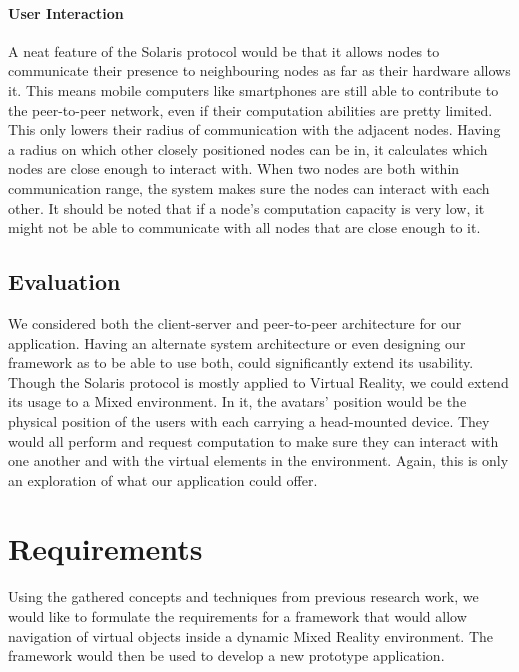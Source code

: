 \paragraph{User Interaction}
A neat feature of the Solaris protocol\cite{keller2002toward} would be that it allows nodes to communicate their presence to neighbouring nodes as far as their hardware allows it. This means mobile computers like smartphones are still able to contribute to the peer-to-peer network, even if their computation abilities are pretty limited. This only lowers their radius of communication with the adjacent nodes. 
\newline
Having a radius on which other closely positioned nodes can be in, it calculates which nodes are close enough to interact with. When two nodes are both within communication range, the system makes sure the nodes can interact with each other. It should be noted that if a node's computation capacity is very low, it might not be able to communicate with all nodes that are close enough to it.

\subsection{Evaluation}
We considered both the client-server and peer-to-peer architecture for our application. Having an alternate system architecture or even designing our framework as to be able to use both, could significantly extend its usability.
\newline
Though the Solaris protocol is mostly applied to Virtual Reality, we could extend its usage to a Mixed environment. In it, the avatars' position would be the physical position of the users with each carrying a head-mounted device. They would all perform and request computation to make sure they can interact with one another and with the virtual elements in the environment. Again, this is only an exploration of what our application could offer.

\section{Requirements}
Using the gathered concepts and techniques from previous research work, we would like to formulate the requirements for a framework that would allow navigation of virtual objects inside a dynamic Mixed Reality environment. The framework would then be used to develop a new prototype application. 

